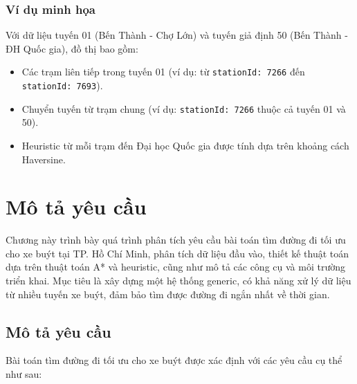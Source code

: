 \documentclass[a4paper,12pt]{article}
\begin{document}
\subsubsection{Ví dụ minh họa}

Với dữ liệu tuyến 01 (Bến Thành - Chợ Lớn) và tuyến giả định 50 (Bến Thành - ĐH Quốc gia), đồ thị bao gồm:
\begin{itemize}
    \item Các trạm liên tiếp trong tuyến 01 (ví dụ: từ \texttt{stationId: 7266} đến \texttt{stationId: 7693}).
    \item Chuyển tuyến từ trạm chung (ví dụ: \texttt{stationId: 7266} thuộc cả tuyến 01 và 50).
    \item Heuristic từ mỗi trạm đến Đại học Quốc gia được tính dựa trên khoảng cách Haversine.
\end{itemize}

\newpage
\section{Mô tả yêu cầu}

Chương này trình bày quá trình phân tích yêu cầu bài toán tìm đường đi tối ưu cho xe buýt tại TP. Hồ Chí Minh, phân tích dữ liệu đầu vào, thiết kế thuật toán dựa trên thuật toán A* và heuristic, cũng như mô tả các công cụ và môi trường triển khai. Mục tiêu là xây dựng một hệ thống generic, có khả năng xử lý dữ liệu từ nhiều tuyến xe buýt, đảm bảo tìm được đường đi ngắn nhất về thời gian.

\subsection{Mô tả yêu cầu}

Bài toán tìm đường đi tối ưu cho xe buýt được xác định với các yêu cầu cụ thể như sau:
\end{document}
